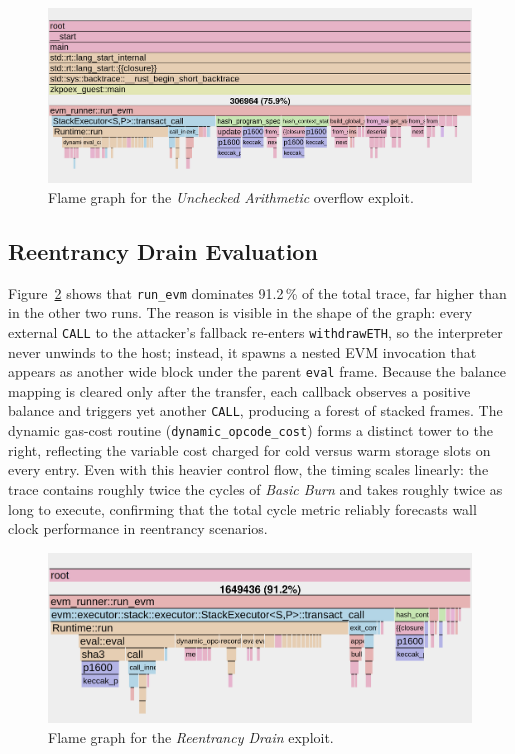 \begin{figure}[h]
  \centering
  \includegraphics[width=\linewidth]{Images/Chap4/overUnderFlowVulnerable_fg.png}
  \caption{Flame graph for the \textit{Unchecked Arithmetic} overflow exploit.}
  \label{fig:flame_overflow}
\end{figure}

\subsection{Reentrancy Drain Evaluation}
Figure~\ref{fig:flame_reentrancy} shows that \texttt{run\_evm} dominates 91.2\,\% of the total trace, far higher than in the other two runs. The reason is visible in the shape of the graph: every external \texttt{CALL} to the attacker’s fallback re-enters \texttt{withdrawETH}, so the interpreter never unwinds to the host; instead, it spawns a nested EVM invocation that appears as another wide block under the parent \texttt{eval} frame.  Because the balance mapping is cleared only after the transfer, each callback observes a positive balance and triggers yet another \texttt{CALL}, producing a forest of stacked frames.  The dynamic gas-cost routine (\texttt{dynamic\_opcode\_cost}) forms a distinct tower to the right, reflecting the variable cost charged for cold versus warm storage slots on every entry.  Even with this heavier control flow, the timing scales linearly: the trace contains roughly twice the cycles of \textit{Basic Burn} and takes roughly twice as long to execute, confirming that the total cycle metric reliably forecasts wall clock performance in reentrancy scenarios.

\begin{figure}[h]
  \centering
  \includegraphics[width=\linewidth]{Images/Chap4/reentrancyVulnerable_fg.png}
  \caption{Flame graph for the \textit{Reentrancy Drain} exploit.}
  \label{fig:flame_reentrancy}
\end{figure}
